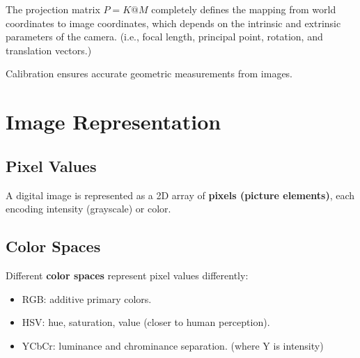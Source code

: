 {The projection matrix $P = K @ M$ completely defines the mapping from world coordinates to image coordinates, which depends on the intrinsic and extrinsic parameters of the camera. (i.e., focal length, principal point, rotation, and translation vectors.)}

Calibration ensures accurate geometric measurements from images.


\section{Image Representation}

\subsection{Pixel Values}
A digital image is represented as a 2D array of \textbf{pixels (picture elements)}, each encoding intensity (grayscale) or color.



\subsection{Color Spaces}
Different \textbf{color spaces} represent pixel values differently:
\begin{itemize}
    \item RGB: additive primary colors.
    \item HSV: hue, saturation, value (closer to human perception).
    \item YCbCr: luminance and chrominance separation. (where Y is intensity)
\end{itemize}



